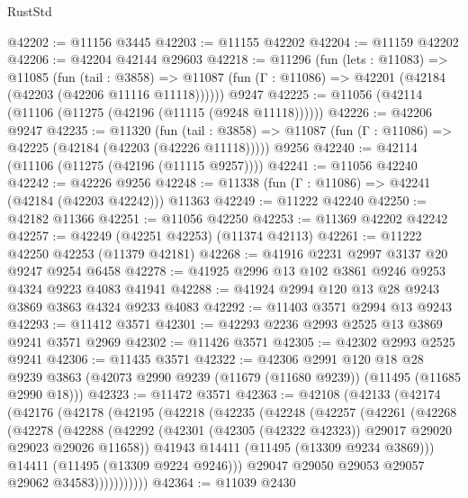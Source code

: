 \begin{lexlean}{RustStd}
\begin{coremodule}
@42202 := @11156 @3445
@42203 := @11155 @42202
@42204 := @11159 @42202
@42206 := @42204 @42144 @29603
@42218 := @11296
    (fun (lets : @11083) =>
    @11085
      (fun (tail : @3858) =>
      @11087 (fun (Γ : @11086) => @42201 (@42184 (@42203 (@42206 @11116 @11118))))))
    @9247
@42225 := @11056 (@42114 (@11106 (@11275 (@42196 (@11115 (@9248 @11118))))))
@42226 := @42206 @9247
@42235 := @11320
    (fun (tail : @3858) => @11087 (fun (Γ : @11086) => @42225 (@42184 (@42203 (@42226 @11118)))))
    @9256
@42240 := @42114 (@11106 (@11275 (@42196 (@11115 @9257))))
@42241 := @11056 @42240
@42242 := @42226 @9256
@42248 := @11338 (fun (Γ : @11086) => @42241 (@42184 (@42203 @42242))) @11363
@42249 := @11222 @42240
@42250 := @42182 @11366
@42251 := @11056 @42250
@42253 := @11369 @42202 @42242
@42257 := @42249 (@42251 @42253) (@11374 @42113)
@42261 := @11222 @42250 @42253 (@11379 @42181)
@42268 := @41916 @2231 @2997 @3137 @20 @9247 @9254 @6458
@42278 := @41925 @2996 @13 @102 @3861 @9246 @9253 @4324 @9223 @4083 @41941
@42288 := @41924 @2994 @120 @13 @28 @9243 @3869 @3863 @4324 @9233 @4083
@42292 := @11403 @3571 @2994 @13 @9243
@42293 := @11412 @3571
@42301 := @42293 @2236 @2993 @2525 @13 @3869 @9241 @3571 @2969
@42302 := @11426 @3571
@42305 := @42302 @2993 @2525 @9241
@42306 := @11435 @3571
@42322 := @42306
    @2991
    @120
    @18
    @28
    @9239
    @3863
    (@42073 @2990 @9239 (@11679 (@11680 @9239)) (@11495 (@11685 @2990 @18)))
@42323 := @11472 @3571
@42363 := @42108
    (@42133
      (@42174
        (@42176
          (@42178
            (@42195
              (@42218
                (@42235
                  (@42248
                    (@42257
                      (@42261
                        (@42268
                          (@42278
                            (@42288
                              (@42292
                                (@42301
                                  (@42305 (@42322 @42323))
                                  @29017
                                  @29020
                                  @29023
                                  @29026
                                  @11658))
                              @41943
                              @14411
                              (@11495 (@13309 @9234 @3869)))
                            @14411
                            (@11495 (@13309 @9224 @9246)))
                          @29047
                          @29050
                          @29053
                          @29057
                          @29062
                          @34583)))))))))))
@42364 := @11039 @2430

\end{coremodule}
\end{lexlean}
